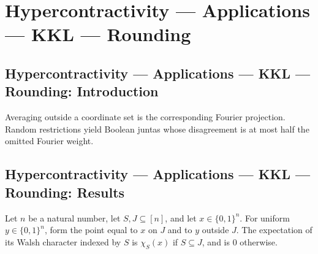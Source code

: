 \section{Hypercontractivity --- Applications --- KKL --- Rounding}
\subsection*{Hypercontractivity --- Applications --- KKL --- Rounding: Introduction}
Averaging outside a coordinate set is the corresponding Fourier projection. Random restrictions yield Boolean juntas whose disagreement is at most half the omitted Fourier weight.

\subsection*{Hypercontractivity --- Applications --- KKL --- Rounding: Results}

\begin{lemma}
\leanok
{}
Let $n$ be a natural number, let $S,J\subseteq[n]$, and let $x\in\{0,1\}^n$. For uniform
$y\in\{0,1\}^n$, form the point equal to $x$ on $J$ and to $y$ outside $J$. The
expectation of its Walsh character indexed by $S$ is $\chi_S(x)$ if $S\subseteq J$, and
is $0$ otherwise.
\end{lemma}

